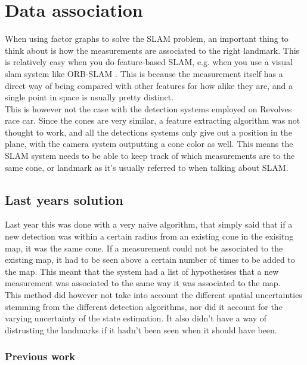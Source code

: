 \section{Data association}

When using factor graphs to solve the SLAM problem, an important thing to think about is how the measurements are associated to the right landmark. This is relatively easy when you do feature-based SLAM, e.g. when you use a visual slam system like ORB-SLAM \cite{ORBSLAM}. This is because the measurement itself has a direct way of being compared with other features for how alike they are, and a single point in space is usually pretty distinct. \\

This is however not the case with the detection systems employed on Revolves race car. Since the cones are very similar, a feature extracting algorithm was not thought to work, and all the detections systems only give out a position in the plane, with the camera system outputting a cone color as well. This means the SLAM system needs to be able to keep track of which measurements are to the same cone, or landmark as it's usually referred to when talking about SLAM. \\

\subsection{Last years solution}

Last year this was done with a very naive algorithm, that simply said that if a new detection was within a certain radius from an existing cone in the exisitng map, it was the same cone. If a measurement could not be associated to the existing map, it had to be seen above a certain number of times to be added to the map. This meant that the system had a list of hypothesises that a new measurement was associated to the same way it was associated to the map. \\ 

This method did however not take into account the different spatial uncertainties stemming from the different detection algorithms, nor did it account for the varying uncertainty of the state estimation. It also didn't have a way of distrusting the landmarks if it hadn't been seen when it should have been. \\

\subsubsection{Previous work} 

